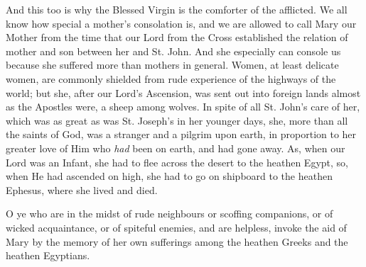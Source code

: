 And this too is why the Blessed
Virgin is the comforter of the afflicted. We all know how special a
mother's consolation is, and we are allowed to call Mary our Mother from
the time that our Lord from the Cross established the relation of mother
and son between her and St. John. And she especially can console us
because she suffered more than mothers in general. Women, at least
delicate women, are commonly shielded from rude experience of the
highways of the world; but she, after our Lord's Ascension, was
sent out into foreign lands almost as the Apostles were, a sheep among
wolves. In spite of all St. John's care of her, which was as great as
was St. Joseph's in her younger days, she, more than all the saints of
God, was a stranger and a pilgrim upon earth, in proportion to her
greater love of Him who \emph{had} been on earth, and had gone away. As,
when our Lord was an Infant, she had to flee across the desert to the
heathen Egypt, so, when He had ascended on high, she had to go on
shipboard to the heathen Ephesus, where she lived and died.

O ye who are in the midst of
rude neighbours or scoffing companions, or of wicked acquaintance, or of
spiteful enemies, and are helpless, invoke the aid of Mary by the memory
of her own sufferings among the heathen Greeks and the heathen
Egyptians.



